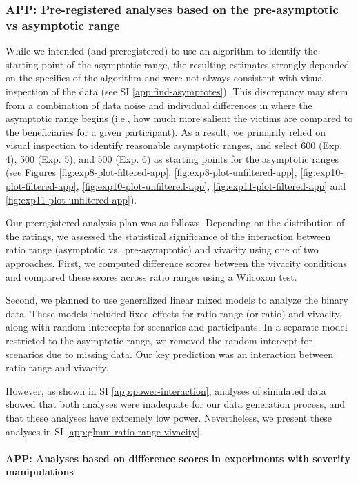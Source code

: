 \documentclass[
]{article}
\begin{document}
\subsubsection{APP: Pre-registered analyses based on the pre-asymptotic vs asymptotic range}\label{app:asymptotic-analyses}

While we intended (and preregistered) to use an algorithm to identify the starting point of the asymptotic range, the resulting estimates strongly depended on the specifics of the algorithm and were not always consistent with visual inspection of the data (see SI \ref{app:find-asymptotes}). This discrepancy may stem from a combination of data noise and individual differences in where the asymptotic range begins (i.e., how much more salient the victims are compared to the beneficiaries for a given participant). As a result, we primarily relied on visual inspection to identify reasonable asymptotic ranges, and select 600 (Exp. 4), 500 (Exp. 5), and 500 (Exp. 6) as starting points for the asymptotic ranges (see
Figures \ref{fig:exp8-plot-filtered-app}, \ref{fig:exp8-plot-unfiltered-app}, \ref{fig:exp10-plot-filtered-app}, \ref{fig:exp10-plot-unfiltered-app}, \ref{fig:exp11-plot-filtered-app} and \ref{fig:exp11-plot-unfiltered-app}).

Our preregistered analysis plan was as follows. Depending on the distribution of the ratings, we assessed the statistical significance of the interaction between ratio range (asymptotic vs.~pre-asymptotic) and vivacity using one of two approaches. First, we computed difference scores between the vivacity conditions and compared these scores across ratio ranges using a Wilcoxon test.

Second, we planned to use generalized linear mixed models to analyze the binary data. These models included fixed effects for ratio range (or ratio) and vivacity, along with random intercepts for scenarios and participants. In a separate model restricted to the asymptotic range, we removed the random intercept for scenarios due to missing data. Our key prediction was an interaction between ratio range and vivacity.

However, as shown in SI \ref{app:power-interaction}, analyses of simulated data showed that both analyses were inadequate for our data generation process, and that these analyses have extremely low power. Nevertheless, we present these analyses in SI \ref{app:glmm-ratio-range-vivacity}.

\paragraph{APP: Analyses based on difference scores in experiments with severity manipulations}\label{app-analyses-based-on-difference-scores-in-experiments-with-severity-manipulations}
\end{document}
